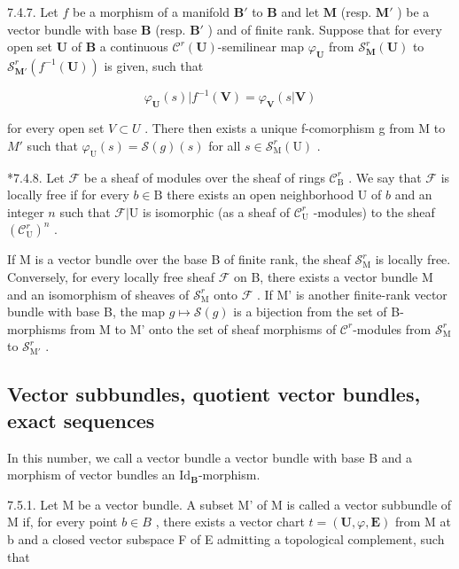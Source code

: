 7.4.7. Let \(f\) be a morphism of a manifold \(\mathbf{B}'\) to \(\mathbf{B}\) and let \(\mathbf{M}\) (resp. \(\mathbf{M}'\) ) be a vector bundle with base \(\mathbf{B}\) (resp. \(\mathbf{B}'\) ) and of finite rank. Suppose that for every open set \(\mathbf{U}\) of \(\mathbf{B}\) a continuous \(\mathcal{C}^{r}(\mathbf{U})\)-semilinear map \(\varphi_{\mathbf{U}}\) from \(\mathcal{S}_{\mathbf{M}}^{r}(\mathbf{U})\) to \(\mathcal{S}_{\mathbf{M}'}^{r}(f^{-1}(\mathbf{U}))\) is given, such that

\[
\varphi_ {\mathbf {U}} (s) | f ^ {- 1} (\mathbf {V}) = \varphi_ {\mathbf {V}} (s | \mathbf {V})
\]

for every open set \(V \subset U\) . There then exists a unique f-comorphism g from M to \(M'\) such that \(\varphi_{\mathrm{U}}(s) = \mathcal{S}(g)(s)\) for all \(s \in \mathcal{S}_{\mathrm{M}}^{r}(\mathrm{U})\) .

*7.4.8. Let \(\mathcal{F}\) be a sheaf of modules over the sheaf of rings \(\mathcal{C}_{\mathrm{B}}^{r}\) . We say that \(\mathcal{F}\) is locally free if for every \(b \in \mathrm{B}\) there exists an open neighborhood U of \(b\) and an integer \(n\) such that \(\mathcal{F}|\mathrm{U}\) is isomorphic (as a sheaf of \(\mathcal{C}_{\mathrm{U}}^{r}\) -modules) to the sheaf \((\mathcal{C}_{\mathrm{U}}^{r})^{n}\) .

If M is a vector bundle over the base B of finite rank, the sheaf \(\mathcal{S}_{\mathrm{M}}^{r}\) is locally free. Conversely, for every locally free sheaf \(\mathcal{F}\) on B, there exists a vector bundle M and an isomorphism of sheaves of \(\mathcal{S}_{\mathrm{M}}^{r}\) onto \(\mathcal{F}\) . If M' is another finite-rank vector bundle with base B, the map \(g \mapsto \mathcal{S}(g)\) is a bijection from the set of B-morphisms from M to M' onto the set of sheaf morphisms of \(\mathcal{C}^{r}\)-modules from \(\mathcal{S}_{\mathrm{M}}^{r}\) to \(\mathcal{S}_{\mathrm{M}'}^{r}\) .

\subsection{Vector subbundles, quotient vector bundles, exact sequences}

In this number, we call a vector bundle a vector bundle with base B and a morphism of vector bundles an \(\mathrm{Id}_{\mathbf{B}}\)-morphism.

7.5.1. Let M be a vector bundle. A subset M' of M is called a vector subbundle of M if, for every point \(b \in B\) , there exists a vector chart \(t = (\mathbf{U}, \varphi, \mathbf{E})\) from M at b and a closed vector subspace F of E admitting a topological complement, such that

